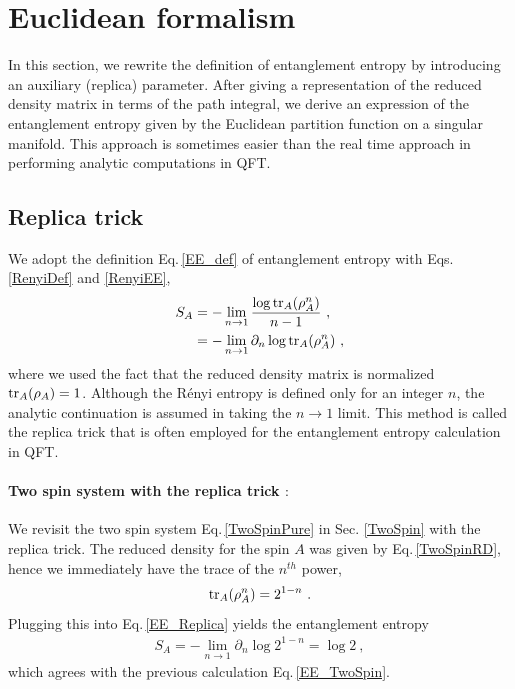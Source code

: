 \section{Euclidean formalism}\label{ss:Euclidean}
In this section, we rewrite the definition of entanglement entropy by introducing an auxiliary (replica) parameter.
After giving a representation of the reduced density matrix in terms of the path integral, we derive an expression of the entanglement entropy given by the Euclidean partition function on a singular manifold. 
This approach is sometimes easier than the real time approach in performing analytic computations in QFT.


\subsection{Replica trick}
We adopt the definition Eq.\,\eqref{EE_def} of entanglement entropy with Eqs.\,\eqref{RenyiDef} and \eqref{RenyiEE},
\begin{align}\label{EE_Replica}
\begin{aligned}
S_A &= -\lim_{n\to 1}\frac{\log {\rm tr}_A( \rho_A^n)}{n-1} \ ,\\
	&= -\lim_{n\to 1}\partial_n \log {\rm tr}_A (\rho_A^n) \ ,
\end{aligned}
\end{align}
where we used the fact that the reduced density matrix is normalized ${\rm tr}_A (\rho_A) = 1$.
Although the R{\'e}nyi entropy is defined only for an integer $n$, the analytic continuation is assumed in taking the $n\to 1$ limit.
This method is called the replica trick that is often employed for the entanglement entropy calculation in QFT.


\paragraph*{Two spin system with the replica trick $:$}
We revisit the two spin system Eq.\,\eqref{TwoSpinPure} in Sec. \ref{TwoSpin} with the replica trick.
The reduced density for the spin $A$ was given by Eq.\,\eqref{TwoSpinRD}, hence we immediately have the trace of the $n^{th}$ power,
\begin{align}
	{\rm tr}_A (\rho_A^n)  = 2^{1-n} \ .
\end{align}
Plugging this into Eq.\,\eqref{EE_Replica} yields the entanglement entropy
\begin{align}
	S_A = - \lim_{n\to 1} \partial_n \log 2^{1-n} = \log 2 \ ,
\end{align}
which agrees with the previous calculation Eq.\,\eqref{EE_TwoSpin}.




